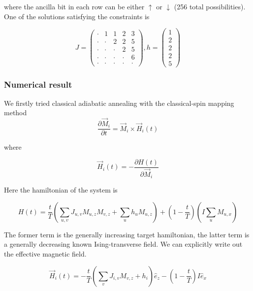 \documentclass[twocolumn,superscriptaddress,english,showpacs,longbibliography]{revtex4-2}
\begin{document}
where the ancilla bit in each row can be either $\uparrow$ or
$\downarrow$ (256 total possibilities). One of the solutions
satisfying the constraints is

\begin{equation}
J = \begin{pmatrix}
\cdot & 1 & 1 & 2 & 3\\
\cdot & \cdot & 2 & 2 & 5\\
\cdot & \cdot & \cdot & 2 & 5\\
\cdot & \cdot & \cdot & \cdot & 6\\
\cdot & \cdot & \cdot & \cdot & \cdot
\end{pmatrix}, h = \begin{pmatrix}
1\\
2\\
2\\
2\\
5
\end{pmatrix}
\end{equation}

\subsubsection{Numerical result}\label{numerical-result-1}

We firstly tried classical adiabatic annealing with the classical-spin
mapping method~\cite{Wang2013}
\begin{equation}
\frac{\partial \vec M_i}{\partial t} = \vec M_{i} \times \vec H_{i}(t)
\end{equation}

where

\begin{equation}
\vec H_i(t) = -\frac{\partial H(t)}{\partial \vec M_i} 
\end{equation}

Here the hamiltonian of the system is

\begin{equation}
H(t) = \frac{t}{T}(\sum_{u,v}J_{u,v} M_{u,z}M_{v,z} + \sum_{u} h_u M_{u, z}) + (1-\frac{t}{T})(I\sum_{u}M_{u,x})
\end{equation}

The former term is the generally increasing target hamiltonian, the
latter term is a generally decreasing known Ising-transverse field. We
can explicitly write out the effective magnetic field.

\[
\vec H_{i}(t) = -\frac{t}{T}(\sum_{v}J_{i, v}M_{v,z} + h_i)\hat e_z - (1-\frac{t}{T})I\hat e_x
\]
\end{document}
